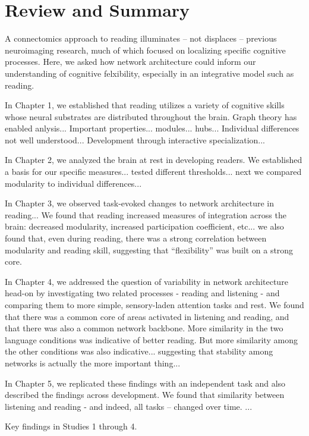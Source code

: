 \chapter{Review and Summary}

A connectomics approach to reading illuminates -- not displaces -- previous neuroimaging research, much of which focused on localizing specific cognitive processes. Here, we asked how network architecture could inform our understanding of cognitive felxibility, especially in an integrative model such as reading. 

In Chapter 1, we established that reading utilizes a variety of cognitive skills whose neural substrates are distributed throughout the brain. Graph theory has enabled anlysis...
Important properties... modules... hubs...
Individual differences not well understood...
Development through interactive specialization...

In Chapter 2, we analyzed the brain at rest in developing readers. We established a basis for our specific measures... tested different thresholds... next we compared modularity to individual differences...

In Chapter 3, we observed task-evoked changes to network architecture in reading... We found that reading increased measures of integration across the brain: decreased modularity, increased participation coefficient, etc... we also found that, even during reading, there was a strong correlation between modularity and reading skill, suggesting that ``flexibility'' was built on a strong core.

In Chapter 4, we addressed the question of variability in network architecture head-on by investigating two related processes - reading and listening - and comparing them to more simple, sensory-laden attention tasks and rest. We found that there was a common core of areas activated in listening and reading, and that there was also a common network backbone. More similarity in the two language conditions was indicative of better reading. But more similarity among the other conditions was also indicative... suggesting that stability among networks is actually the more important thing...

In Chapter 5, we replicated these findings with an independent task and also described the findings across development. We found that similarity between listening and reading - and indeed, all tasks -- changed over time. ...

\begin{table}[t]
	\renewcommand{\tabcolsep}{0.09cm}
	\centering
	
	\caption[Key findings.]{Key findings in Studies 1 through 4.}
	\label{table:ch6-key-findings}
\end{table}

